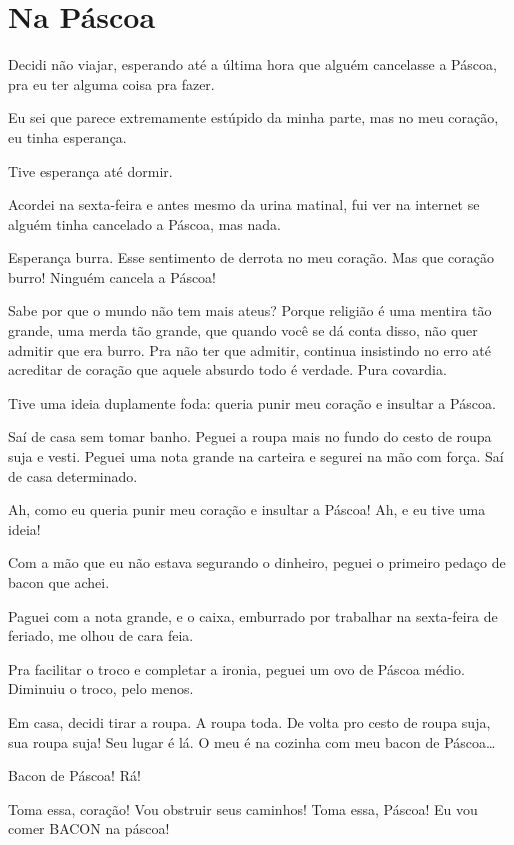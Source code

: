 \chapter{Na Páscoa}

Decidi não viajar, esperando até a última hora que alguém cancelasse a Páscoa, pra eu ter alguma coisa pra fazer.

Eu sei que parece extremamente estúpido da minha parte, mas no meu coração, eu tinha esperança.

Tive esperança até dormir.

Acordei na sexta-feira e antes mesmo da urina matinal, fui ver na internet se alguém tinha cancelado a Páscoa, mas nada.

Esperança burra. Esse sentimento de derrota no meu coração. Mas que coração burro! Ninguém cancela a Páscoa!

Sabe por que o mundo não tem mais ateus? Porque religião é uma mentira tão grande, uma merda tão grande, que quando você se dá conta disso, não quer admitir que era burro. Pra não ter que admitir, continua insistindo no erro até acreditar de coração que aquele absurdo todo é verdade. Pura covardia.

Tive uma ideia duplamente foda: queria punir meu coração e insultar a Páscoa.

\begin{sloppypar}
Saí de casa sem tomar banho. Peguei a roupa mais no fundo do cesto de roupa suja e vesti. Peguei uma nota grande na carteira e segurei na mão com força. Saí de casa determinado.
\end{sloppypar}

Ah, como eu queria punir meu coração e insultar a Páscoa! Ah, e eu tive uma ideia!

Com a mão que eu não estava segurando o dinheiro, peguei o primeiro pedaço de bacon que achei.

Paguei com a nota grande, e o caixa, emburrado por trabalhar na sexta-feira de feriado, me olhou de cara feia.

Pra facilitar o troco e completar a ironia, peguei um ovo de Páscoa médio. Diminuiu o troco, pelo menos.

Em casa, decidi tirar a roupa. A roupa toda. De volta pro cesto de roupa suja, sua roupa suja! Seu lugar é lá. O meu é na cozinha com meu bacon de Páscoa\ldots

Bacon de Páscoa! Rá!

Toma essa, coração! Vou obstruir seus caminhos! Toma essa, Páscoa! Eu vou comer BACON na páscoa!


